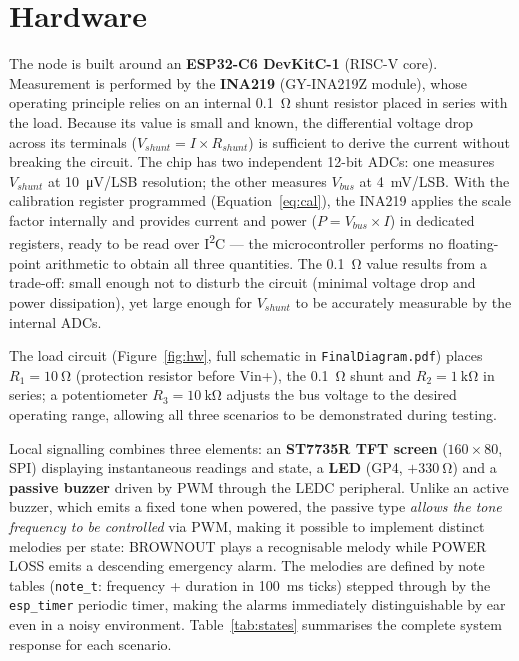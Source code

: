 \documentclass[10pt,a4paper]{article}
\newcommand{\code}[1]{\texttt{\small #1}}
\begin{document}
\section{Hardware}

The node is built around an \textbf{ESP32-C6 DevKitC-1} (RISC-V core). Measurement
is performed by the \textbf{INA219} (GY-INA219Z module), whose operating principle
relies on an internal \SI{0.1}{\ohm} shunt resistor placed in series with the load.
Because its value is small and known, the differential voltage drop across its
terminals ($V_{shunt} = I \times R_{shunt}$) is sufficient to derive the current
without breaking the circuit. The chip has two independent 12-bit ADCs: one measures
$V_{shunt}$ at \SI{10}{\micro\volt}/LSB resolution; the other measures $V_{bus}$ at
\SI{4}{\milli\volt}/LSB. With the calibration register programmed
(Equation~\ref{eq:cal}), the INA219 applies the scale factor internally and provides
current and power ($P = V_{bus} \times I$) in dedicated registers, ready to be read
over I\textsuperscript{2}C --- the microcontroller performs no floating-point
arithmetic to obtain all three quantities. The \SI{0.1}{\ohm} value results from a
trade-off: small enough not to disturb the circuit (minimal voltage drop and power
dissipation), yet large enough for $V_{shunt}$ to be accurately measurable by the
internal ADCs.

The load circuit (Figure~\ref{fig:hw}, full schematic in \code{FinalDiagram.pdf})
places $R_1 = \SI{10}{\ohm}$ (protection resistor before Vin+), the \SI{0.1}{\ohm}
shunt and $R_2 = \SI{1}{\kilo\ohm}$ in series; a potentiometer $R_3 = \SI{10}{\kilo\ohm}$
adjusts the bus voltage to the desired operating range, allowing all three scenarios
to be demonstrated during testing.

Local signalling combines three elements: an \textbf{ST7735R TFT screen}
($160 \times 80$, SPI) displaying instantaneous readings and state, a \textbf{LED}
(GP4, $+\SI{330}{\ohm}$) and a \textbf{passive buzzer} driven by PWM through the
LEDC peripheral. Unlike an active buzzer, which emits a fixed tone when powered, the
passive type \emph{allows the tone frequency to be controlled} via PWM, making it
possible to implement distinct melodies per state: BROWNOUT plays a recognisable
melody while POWER LOSS emits a descending emergency alarm. The melodies are defined
by note tables (\code{note\_t}: frequency + duration in \SI{100}{\milli\second}
ticks) stepped through by the \code{esp\_timer} periodic timer, making the alarms
immediately distinguishable by ear even in a noisy environment.
Table~\ref{tab:states} summarises the complete system response for each scenario.
\end{document}
